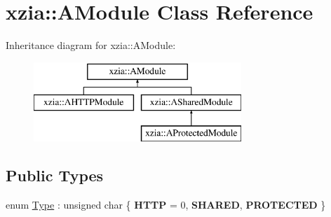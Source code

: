 \hypertarget{classxzia_1_1AModule}{}\section{xzia\+:\+:A\+Module Class Reference}
\label{classxzia_1_1AModule}
Inheritance diagram for xzia\+:\+:A\+Module\+:\begin{figure}[H]
\begin{center}
\leavevmode
\includegraphics[height=3.000000cm]{classxzia_1_1AModule}
\end{center}
\end{figure}
\subsection*{Public Types}
\begin{DoxyCompactItemize}
\item 
enum \mbox{\hyperlink{classxzia_1_1AModule_a73967be2c863fcfdff0eef4a701df1e0}{Type}} \+: unsigned char \{ {\bfseries H\+T\+TP} = 0, 
{\bfseries S\+H\+A\+R\+ED}, 
{\bfseries P\+R\+O\+T\+E\+C\+T\+ED}
 \}
\end{DoxyCompactItemize}
